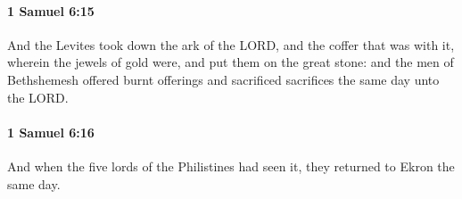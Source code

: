 		\paragraph{1 Samuel 6:15} %
			\label{1SAMUEL-6-15}

			And the Levites took down the ark of the LORD, and the coffer that was with it, wherein the jewels of gold were, and put them on the great stone: and the men of Bethshemesh offered burnt offerings and sacrificed sacrifices the same day unto the LORD.


		\paragraph{1 Samuel 6:16} %
			\label{1SAMUEL-6-16}

			And when the five lords of the Philistines had seen it, they returned to Ekron the same day.


